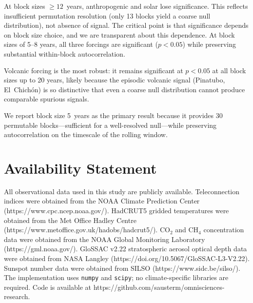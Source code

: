 \documentclass[preprint,12pt]{elsarticle}
\newcommand{\pval}{p}
\begin{document}
At block sizes $\geq 12$~years, anthropogenic and solar lose significance.
This reflects insufficient permutation resolution (only 13 blocks yield a coarse null distribution), not absence of signal.
The critical point is that significance depends on block size choice, and we are transparent about this dependence.
At block sizes of 5--8 years, all three forcings are significant ($\pval < 0.05$) while preserving substantial within-block autocorrelation.

Volcanic forcing is the most robust: it remains significant at $\pval < 0.05$ at all block sizes up to 20 years, likely because the episodic volcanic signal (Pinatubo, El~Chich\'{o}n) is so distinctive that even a coarse null distribution cannot produce comparable spurious signals.

We report block size 5~years as the primary result because it provides 30 permutable blocks---sufficient for a well-resolved null---while preserving autocorrelation on the timescale of the rolling window.



\section*{Availability Statement}

All observational data used in this study are publicly available.
Teleconnection indices were obtained from the NOAA Climate Prediction Center (https://www.cpc.ncep.noaa.gov/).
HadCRUT5 gridded temperatures were obtained from the Met Office Hadley Centre (https://www.metoffice.gov.uk/hadobs/hadcrut5/).
CO$_2$ and CH$_4$ concentration data were obtained from the NOAA Global Monitoring Laboratory (https://gml.noaa.gov/).
GloSSAC v2.22 stratospheric aerosol optical depth data were obtained from NASA Langley (https://doi.org/10.5067/GloSSAC-L3-V2.22).
Sunspot number data were obtained from SILSO (https://www.sidc.be/silso/).
The implementation uses \texttt{numpy} and \texttt{scipy}; no climate-specific libraries are required.
Code is available at https://github.com/sausterm/omnisciences-research.


\end{document}
